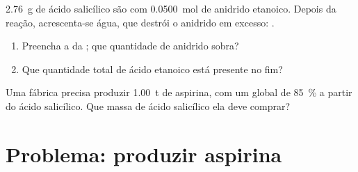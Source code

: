 \begin{exercise}[$\star\star\star$]\label{exo:g10:synthesis-yield:14}
\qty{2.76}{g} de ácido salicílico são  com \qty{0.0500}{mol}
de anidrido etanoico. Depois da reação, acrescenta-se água, que destrói
o anidrido em excesso: .
\begin{enumerate}
  \item Preencha a  da ; que quantidade de
        anidrido sobra?
  \item Que quantidade total de ácido etanoico está presente no fim?
\end{enumerate}
\end{exercise}

\begin{exercise}[$\star\star\star$]\label{exo:g10:synthesis-yield:15}
Uma fábrica precisa produzir \qty{1.00}{t} de aspirina, com um
 global de \qty{85}{\percent} a partir do ácido salicílico.
Que massa de ácido salicílico ela deve comprar?
\end{exercise}

\section{Problema: produzir aspirina}

